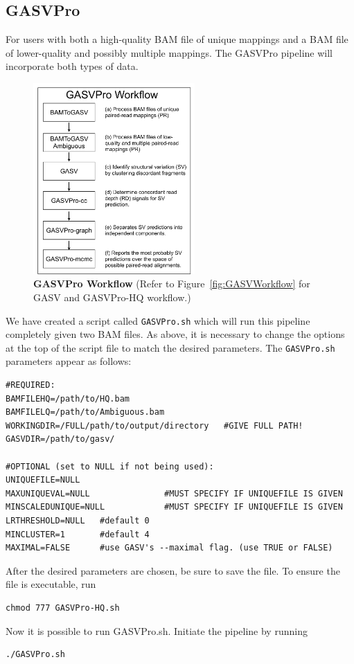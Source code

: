 \documentclass[11pt]{article}
\begin{document}
\subsection{GASVPro}
For users with both a high-quality BAM file of unique mappings and a BAM file of lower-quality and possibly multiple mappings. The GASVPro pipeline will incorporate both types of data. 

\begin{figure}[htbp]
   \centering
    \includegraphics[width=0.55\textwidth]{Figures/GASVPro_Workflow.pdf}
  \caption{\textbf{GASVPro Workflow} (Refer to Figure~\ref{fig:GASVWorkflow} for GASV and GASVPro-HQ workflow.)}
  \label{fig:GASVProWorkflow}
\end{figure}

We have created a script called \verb+GASVPro.sh+ which will run this pipeline completely given two BAM files. As above, it is necessary to change the options at the top of the script file to match the desired parameters. The \verb+GASVPro.sh+ parameters appear as follows:
\begin {Verbatim}[frame=single]
#REQUIRED:
BAMFILEHQ=/path/to/HQ.bam
BAMFILELQ=/path/to/Ambiguous.bam
WORKINGDIR=/FULL/path/to/output/directory   #GIVE FULL PATH!
GASVDIR=/path/to/gasv/
                  
#OPTIONAL (set to NULL if not being used):
UNIQUEFILE=NULL
MAXUNIQUEVAL=NULL               #MUST SPECIFY IF UNIQUEFILE IS GIVEN
MINSCALEDUNIQUE=NULL            #MUST SPECIFY IF UNIQUEFILE IS GIVEN
LRTHRESHOLD=NULL   #default 0
MINCLUSTER=1       #default 4
MAXIMAL=FALSE      #use GASV's --maximal flag. (use TRUE or FALSE)
\end{Verbatim}

\noindent After the desired parameters are chosen, be sure to save the file. To ensure the file is executable, run 
\begin{Verbatim}[frame=single]
chmod 777 GASVPro-HQ.sh
\end{Verbatim}
Now it is possible to run GASVPro.sh. Initiate the pipeline by running 
\begin{Verbatim}[frame=single]
./GASVPro.sh
\end{Verbatim}
\end{document}
